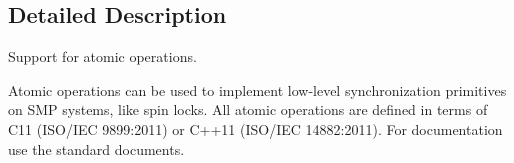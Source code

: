 \subsection{Detailed Description}
Support for atomic operations. 

Atomic operations can be used to implement low-\/level synchronization primitives on S\+MP systems, like spin locks. All atomic operations are defined in terms of C11 (I\+S\+O/\+I\+EC 9899\+:2011) or C++11 (I\+S\+O/\+I\+EC 14882\+:2011). For documentation use the standard documents. 